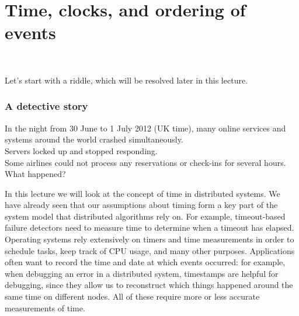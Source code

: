 
\section{Time, clocks, and ordering of events}\label{sec:time}

\begin{frame}
    \begin{center}
        {\Large{\color{darkblue}{Time, clocks, and ordering of events}}} \\[2em]
        \mydetails
    \end{center}
\end{frame}

Let's start with a riddle, which will be resolved later in this lecture.

\begin{frame}
    \label{s:mystery}
    \frametitle{A detective story}
    In the night from 30 June to 1 July 2012 (UK time), many online services and systems around the world crashed simultaneously.\\[1em]
    Servers locked up and stopped responding.\\[1em]
    Some airlines could not process any reservations or check-ins for several hours.\\[1em]
    What happened?
\end{frame}
\label{l:mystery}

In this lecture we will look at the concept of time in distributed systems.
We have already seen that our assumptions about timing form a key part of the system model that distributed algorithms rely on.
For example, timeout-based failure detectors need to measure time to determine when a timeout has elapsed.
Operating systems rely extensively on timers and time measurements in order to schedule tasks, keep track of CPU usage, and many other purposes.
Applications often want to record the time and date at which events occurred: for example, when debugging an error in a distributed system, timestamps are helpful for debugging, since they allow us to reconstruct which things happened around the same time on different nodes.
All of these require more or less accurate measurements of time.

